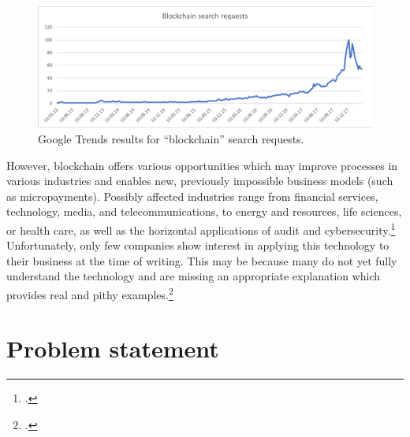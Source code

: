 \begin{figure}
    \centering
    \includegraphics[width=\textwidth]{latex-vorlage_v1.5/graphics/BCRQ.png}
    \caption[Google Trends results for \enquote{blockchain} search requests.]{Google Trends results for \enquote{blockchain} search requests.\protect\footnotemark}
    \label{fig:SearchRequests}
\end{figure}

However, blockchain offers various opportunities which may improve processes in various industries and enables new, previously impossible business models (such as micropayments). Possibly affected industries range from financial services, technology, media, and telecommunications, to energy and resources, life sciences, or health care, as well as the horizontal applications of audit and cybersecurity.\footcite[Cf.][]{SchatskybitcoinBlockchaincoming2015} Unfortunately, only few companies show interest in applying this technology to their business at the time of writing. This may be because many do not yet fully understand the technology and are missing an appropriate explanation which provides real and pithy examples.\footcite[Cf.][P88]{BjoernPaulewicz_Interview}



\section{Problem statement} \label{sec:Problem}


